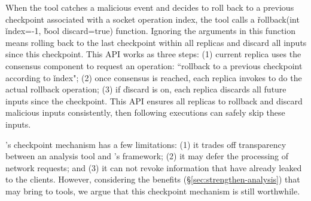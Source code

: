 When the tool catches a malicious event and decides to roll back to a previous
checkpoint associated with a socket operation index, the tool calls a 
\v{rollback(int} \v{index=-1,} \v{bool discard=true)} function. Ignoring the 
arguments in this function means rolling back to the last checkpoint within all 
replicas and discard all inputs since this checkpoint. This API works as three 
steps: (1) current replica uses the \paxos consensus component to request an 
operation: ``rollback to a previous checkpoint according to \v{index}"; (2) 
once consensus is reached, each replica invokes \criu to do the actual rollback 
operation; (3) if \v{discard} is on, each replica discards all future inputs 
since the checkpoint. This API ensures all replicas to rollback and discard 
malicious inputs consistently, then following executions can safely skip these 
inputs.


\xxx's checkpoint mechanism has a few limitations: (1) it 
trades off transparency between an analysis tool and \xxx's framework; (2) it 
may defer the processing of network requests; and (3) it can not revoke 
information that have already leaked to the clients. However, considering the 
benefits (\S\ref{sec:strengthen-analysis}) that \xxx may bring to tools, we 
argue that this checkpoint mechanism is still worthwhile.





